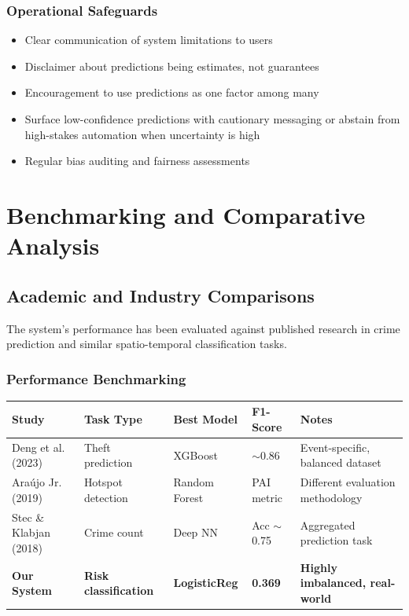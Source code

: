 \documentclass[11pt]{article}
\begin{document}
\subsubsection{Operational Safeguards}
\begin{itemize}[leftmargin=*]
\item Clear communication of system limitations to users
\item Disclaimer about predictions being estimates, not guarantees
\item Encouragement to use predictions as one factor among many
\item Surface low-confidence predictions with cautionary messaging or abstain from high-stakes automation when uncertainty is high
\item Regular bias auditing and fairness assessments
\end{itemize}

\section{Benchmarking and Comparative Analysis}

\subsection{Academic and Industry Comparisons}
The system's performance has been evaluated against published research in crime prediction and similar spatio-temporal classification tasks.

\subsubsection{Performance Benchmarking}
\begin{center}
\begin{tabular}{p{3.5cm} p{2.5cm} p{2cm} p{2.5cm} p{3cm}}
\toprule
\textbf{Study} & \textbf{Task Type} & \textbf{Best Model} & \textbf{F1-Score} & \textbf{Notes} \\
\midrule
Deng et al. (2023) & Theft prediction & XGBoost & $\sim$0.86 & Event-specific, balanced dataset \\
Araújo Jr. (2019) & Hotspot detection & Random Forest & PAI metric & Different evaluation methodology \\
Stec \& Klabjan (2018) & Crime count & Deep NN & Acc $\sim$0.75 & Aggregated prediction task \\
\textbf{Our System} & \textbf{Risk classification} & \textbf{LogisticReg} & \textbf{0.369} & \textbf{Highly imbalanced, real-world} \\
\bottomrule
\end{tabular}
\end{center}
\end{document}
